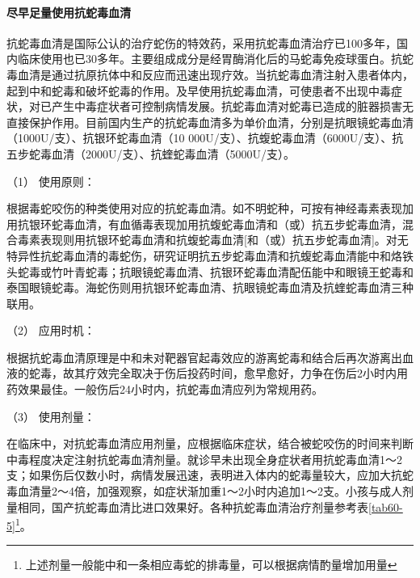 \paragraph{尽早足量使用抗蛇毒血清}

抗蛇毒血清是国际公认的治疗蛇伤的特效药，采用抗蛇毒血清治疗已100多年，国内临床使用也已30多年。主要组成成分是经胃酶消化后的马蛇毒免疫球蛋白。抗蛇毒血清是通过抗原抗体中和反应而迅速出现疗效。当抗蛇毒血清注射入患者体内，起到中和蛇毒和破坏蛇毒的作用。及早使用抗蛇毒血清，可使患者不出现中毒症状，对已产生中毒症状者可控制病情发展。抗蛇毒血清对蛇毒已造成的脏器损害无直接保护作用。目前国内生产的抗蛇毒血清多为单价血清，分别是抗眼镜蛇毒血清（1000U/支）、抗银环蛇毒血清（10
000U/支）、抗蝮蛇毒血清（6000U/支）、抗五步蛇毒血清（2000U/支）、抗蝰蛇毒血清（5000U/支）。

\hypertarget{text00172.htmlux5cux23CHP5-8-1-3-3-1-3-1}{}
（1） 使用原则：

根据毒蛇咬伤的种类使用对应的抗蛇毒血清。如不明蛇种，可按有神经毒素表现加用抗银环蛇毒血清，有血循毒表现加用抗蝮蛇毒血清和（或）抗五步蛇毒血清，混合毒素表现则用抗银环蛇毒血清和抗蝮蛇毒血清{[}和（或）抗五步蛇毒血清{]}。对无特异性抗蛇毒血清的毒蛇伤，研究证明抗五步蛇毒血清和抗蝮蛇毒血清能中和烙铁头蛇毒或竹叶青蛇毒；抗眼镜蛇毒血清、抗银环蛇毒血清配伍能中和眼镜王蛇毒和泰国眼镜蛇毒。海蛇伤则用抗银环蛇毒血清、抗眼镜蛇毒血清及抗蝰蛇毒血清三种联用。

\hypertarget{text00172.htmlux5cux23CHP5-8-1-3-3-1-3-2}{}
（2） 应用时机：

根据抗蛇毒血清原理是中和未对靶器官起毒效应的游离蛇毒和结合后再次游离出血液的蛇毒，故其疗效完全取决于伤后投药时间，愈早愈好，力争在伤后2小时内用药效果最佳。一般伤后24小时内，抗蛇毒血清应列为常规用药。

\hypertarget{text00172.htmlux5cux23CHP5-8-1-3-3-1-3-3}{}
（3） 使用剂量：

在临床中，对抗蛇毒血清应用剂量，应根据临床症状，结合被蛇咬伤的时间来判断中毒程度决定注射抗蛇毒血清剂量。就诊早未出现全身症状者用抗蛇毒血清1～2支；如果伤后仅数小时，病情发展迅速，表明进入体内的蛇毒量较大，应加大抗蛇毒血清量2～4倍，加强观察，如症状渐加重1～2小时内追加1～2支。小孩与成人剂量相同，国产抗蛇毒血清比进口效果好。各种抗蛇毒血清治疗剂量参考表\ref{tab60-5}\footnote{上述剂量一般能中和一条相应毒蛇的排毒量，可以根据病情酌量增加用量}。

